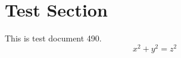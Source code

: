 \documentclass{article}
\begin{document}
\section{Test Section}
This is test document 490.
\begin{equation}
x^2 + y^2 = z^2
\end{equation}
\end{document}
